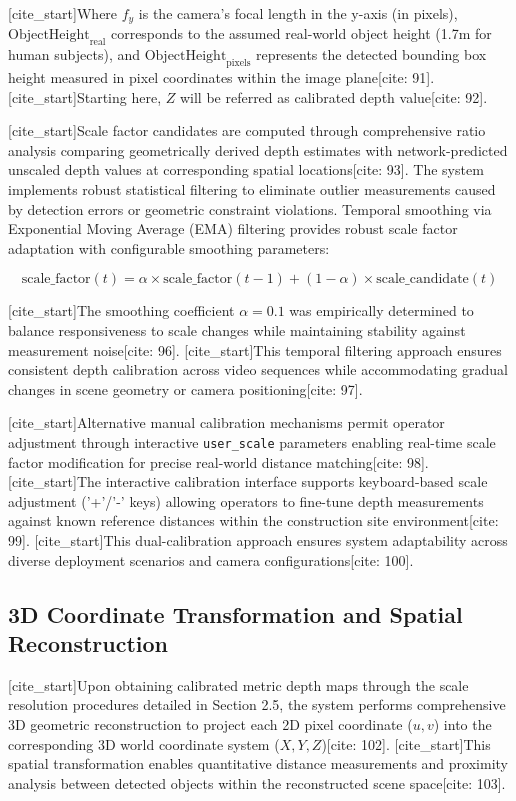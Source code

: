 [cite_start]Where $f_y$ is the camera's focal length in the y-axis (in pixels), $\text{ObjectHeight}_{\text{real}}$ corresponds to the assumed real-world object height (1.7m for human subjects), and $\text{ObjectHeight}_{\text{pixels}}$ represents the detected bounding box height measured in pixel coordinates within the image plane[cite: 91]. [cite_start]Starting here, $Z$ will be referred as calibrated depth value[cite: 92].

[cite_start]Scale factor candidates are computed through comprehensive ratio analysis comparing geometrically derived depth estimates with network-predicted unscaled depth values at corresponding spatial locations[cite: 93]. The system implements robust statistical filtering to eliminate outlier measurements caused by detection errors or geometric constraint violations. Temporal smoothing via Exponential Moving Average (EMA) filtering provides robust scale factor adaptation with configurable smoothing parameters:

\begin{equation}
    \text{scale\_factor}(t) = \alpha \times \text{scale\_factor}(t-1) + (1-\alpha) \times \text{scale\_candidate}(t)
\end{equation}

[cite_start]The smoothing coefficient $\alpha=0.1$ was empirically determined to balance responsiveness to scale changes while maintaining stability against measurement noise[cite: 96]. [cite_start]This temporal filtering approach ensures consistent depth calibration across video sequences while accommodating gradual changes in scene geometry or camera positioning[cite: 97].

[cite_start]Alternative manual calibration mechanisms permit operator adjustment through interactive \texttt{user\_scale} parameters enabling real-time scale factor modification for precise real-world distance matching[cite: 98]. [cite_start]The interactive calibration interface supports keyboard-based scale adjustment ('+'/'-' keys) allowing operators to fine-tune depth measurements against known reference distances within the construction site environment[cite: 99]. [cite_start]This dual-calibration approach ensures system adaptability across diverse deployment scenarios and camera configurations[cite: 100].

\subsection{3D Coordinate Transformation and Spatial Reconstruction}
[cite_start]Upon obtaining calibrated metric depth maps through the scale resolution procedures detailed in Section 2.5, the system performs comprehensive 3D geometric reconstruction to project each 2D pixel coordinate ($u, v$) into the corresponding 3D world coordinate system ($X, Y, Z$)[cite: 102]. [cite_start]This spatial transformation enables quantitative distance measurements and proximity analysis between detected objects within the reconstructed scene space[cite: 103].

